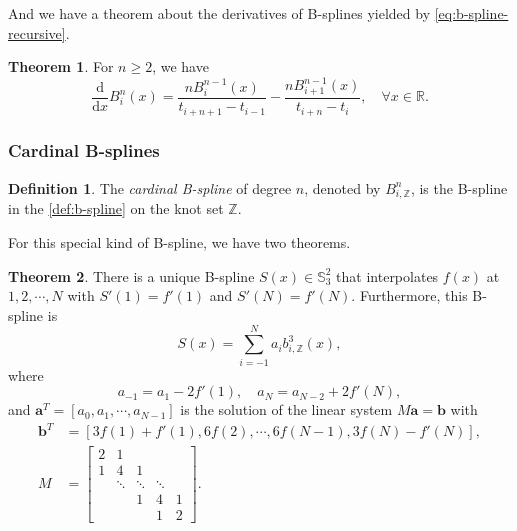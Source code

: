 \documentclass[a4paper]{article}
\theoremstyle{definition}
\newtheorem{definition}{Definition}
\newtheorem{theorem}{Theorem}
\begin{document}
\vspace{1em}
And we have a theorem about the derivatives of B-splines yielded by \cref{eq:b-spline-recursive}.
\begin{theorem}
  For $n \geqslant 2$, we have 
  \begin{equation}
    \frac{\mathrm{d}}{\mathrm{d}x}B_i^n(x) = \frac{nB_i^{n - 1}(x)}{t_{i + n + 1} - t_{i - 1}} - \frac{nB_{i + 1}^{n - 1}(x)}{t_{i + n} - t_i}, \quad \forall x \in \mathbb{R}.
    \label{eq:b-spline-derivative}
  \end{equation}
\end{theorem}

\subsubsection{Cardinal B-splines}

\begin{definition}
  The \textit{cardinal B-spline} of degree $n$, denoted by $B_{i, \mathbb{Z}}^n$, is the B-spline in the \cref{def:b-spline} on the knot set $\mathbb{Z}$.
  \label{def:cardinal-b-spline}
\end{definition}

For this special kind of B-spline, we have two theorems.

\begin{theorem}
  There is a unique B-spline $S(x) \in \mathbb{S}_3^2$ that interpolates $f(x)$ at $1, 2, \cdots, N$ with $S'(1) = f'(1)$ and $S'(N) = f'(N)$. Furthermore, this B-spline is 
  \begin{equation}
    S(x) = \sum_{i = -1}^N a_i b_{i, \mathbb{Z}}^3(x),
    \label{eq:cardinal-cubic-b-spline-interpolation}
  \end{equation}
  where 
  \begin{equation}
    a_{-1} = a_1 - 2f'(1),\quad a_N = a_{N - 2} + 2f'(N),
    \label{eq:cardinal-cubic-b-spline-coefficients}
  \end{equation}
  and $\mathbf{a}^T = [a_0, a_1, \cdots, a_{N - 1}]$ is the solution of the linear system $M \mathbf{a} = \mathbf{b}$ with 
  \begin{equation}
    \begin{aligned}
      \mathbf{b}^T &= [3f(1) + f'(1), 6f(2), \cdots, 6f(N - 1), 3f(N) - f'(N)], \\
      M &= \begin{bmatrix}
        2 & 1 &   &   &   \\
        1 & 4 & 1 &   &   \\
          & \ddots & \ddots & \ddots &   \\
          &   & 1 & 4 & 1 \\
          &   &   & 1 & 2
      \end{bmatrix}.
    \end{aligned}
    \label{eq:cardinal-cubic-b-spline-linear-system}
  \end{equation}
  \label{thm:cardinal-cubic-b-spline-interpolation}
\end{theorem}
\end{document}
